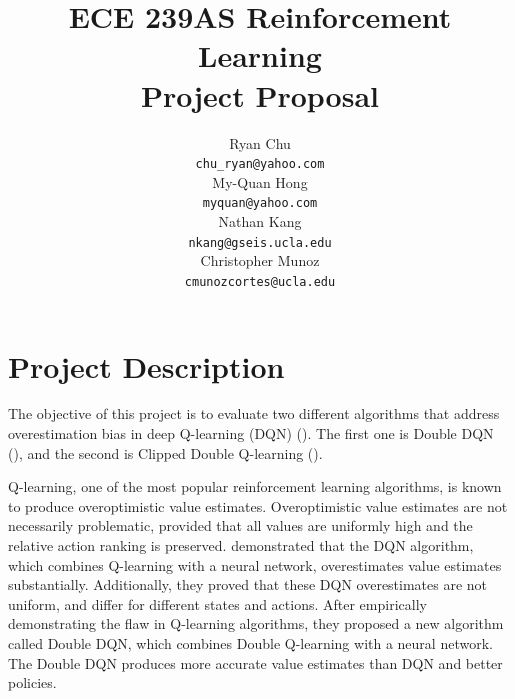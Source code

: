 \documentclass{article}
\title{ECE 239AS Reinforcement Learning\\
       Project Proposal}
\author{%
    Ryan Chu \\
    \texttt{chu\_ryan@yahoo.com}\\
    \And
    My-Quan Hong \\
    \texttt{myquan@yahoo.com} \\
    \And
    Nathan Kang \\
    \texttt{nkang@gseis.ucla.edu} \\
    \And
    Christopher Munoz \\
    \texttt{cmunozcortes@ucla.edu} \\
}
\begin{document}
\maketitle

\section{Project Description}


The objective of this project is to evaluate two different algorithms that
address overestimation bias in deep Q-learning (DQN) (\citet{mnih2015human}).
The first one is Double DQN (\citet{van2016deep}), and the second is Clipped
Double Q-learning (\citet{fujimoto2018addressing}).

Q-learning, one of the most popular reinforcement learning algorithms, is known
to produce overoptimistic value estimates. Overoptimistic value estimates are
not necessarily problematic, provided that all values are uniformly high and the
relative action ranking is preserved.  \citet{van2016deep} demonstrated that the
DQN algorithm, which combines Q-learning with a neural network, overestimates
value estimates substantially.  Additionally, they proved that these DQN
overestimates are not uniform, and differ for different states and actions.
After empirically demonstrating the flaw in Q-learning algorithms, they proposed
a new algorithm called Double DQN, which combines Double Q-learning with a
neural network. The Double DQN produces more accurate value estimates than DQN
and better policies.
\end{document}
